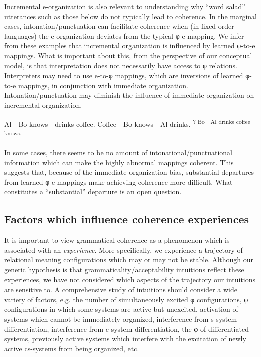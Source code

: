   Incremental e-organization is also relevant to understanding why “word salad” utterances such as those below do not typically lead to coherence. In the marginal cases, intonation/punctuation can facilitate coherence when (in fixed order languages) the e-organization deviates from the typical φ-e mapping. We infer from these examples that incremental organization is influenced by learned φ-to-e mappings. What is important about this, from the perspective of our conceptual model, is that interpretation does not necessarily have access to φ relations. Interpreters may need to use e-to-φ mappings, which are inversions of learned φ-to-e mappings, in conjunction with immediate organization. Intonation/punctuation may diminish the influence of immediate organization on incremental organization. 

\ea
     \biberror{[F0E0?]} {Al—Bo knows—drinks coffee.}
     \biberror{[F0E0?]} {Coffee—Bo knows—Al drinks.}
    \biberror{[F0E0?]}  \textsuperscript{? Bo—Al drinks coffee—knows.}
\z
\z

In some cases, there seems to be no amount of intonational/punctuational information which can make the highly abnormal mappings coherent. This suggests that, because of the immediate organization bias, substantial departures from learned φ-e mappings make achieving coherence more difficult. What constitutes a “substantial” departure is an open question.

\subsection{Factors which influence coherence experiences}

It is important to view grammatical coherence as a phenomenon which is associated with an \textit{experience}. More specifically, we experience a trajectory of relational meaning configurations which may or may not be stable. Although our generic hypothesis is that grammaticality/acceptability intuitions reflect these experiences, we have not considered which aspects of the trajectory our intuitions are sensitive to. A comprehensive study of intuitions should consider a wide variety of factors, e.g. the number of simultaneously excited φ configurations, φ configurations in which some systems are active but unexcited, activation of systems which cannot be immediately organized, interference from s-system differentiation, interference from c-system differentiation, the φ of differentiated systems, previously active systems which interfere with the excitation of newly active cs-systems from being organized, etc. 

